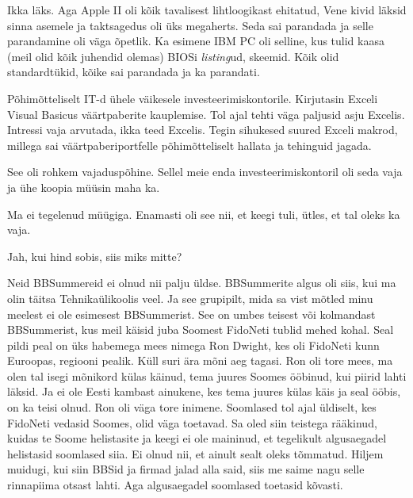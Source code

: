 
Ikka läks. Aga Apple II oli kõik tavalisest 
lihtloogikast ehitatud, Vene kivid läksid sinna asemele ja taktsagedus oli üks 
megaherts. Seda sai parandada ja selle parandamine oli väga õpetlik. Ka 
esimene IBM PC oli selline, kus tulid kaasa (meil olid 
kõik juhendid olemas)  BIOSi \emph{listing}ud, skeemid. Kõik olid 
standardtükid, kõike sai parandada ja ka parandati. 


Põhimõtteliselt IT-d ühele väikesele investeerimiskontorile. Kirjutasin 
Exceli Visual Basicus väärtpaberite 
kauplemise. Tol ajal tehti väga paljusid asju Excelis. Intressi vaja arvutada, 
ikka teed Excelis. Tegin sihukesed suured Exceli makrod, millega sai 
väärtpaberiportfelle põhimõtteliselt hallata ja tehinguid jagada. 


See oli rohkem vajaduspõhine. Sellel meie enda investeerimiskontoril oli seda 
vaja ja ühe koopia müüsin maha ka. 


Ma ei  tegelenud müügiga. Enamasti oli see nii, et keegi tuli, ütles, et tal 
oleks ka vaja. 


Jah, kui hind sobis, siis miks mitte?


Neid BBSummereid ei olnud nii palju üldse. BBSummerite algus  oli siis, kui ma 
olin täitsa Tehnikaülikoolis veel. Ja see grupipilt, mida sa vist 
mõtled minu  
meelest ei ole esimesest BBSummerist. See on umbes teisest või kolmandast 
BBSummerist, kus meil käisid juba Soomest FidoNeti tublid mehed kohal. Seal 
pildi peal on üks habemega mees nimega Ron Dwight, kes 
oli FidoNeti kunn Euroopas, regiooni pealik. Küll suri ära mõni aeg tagasi. Ron 
oli tore mees, ma olen tal isegi mõnikord külas käinud, tema juures Soomes 
ööbinud, kui piirid lahti läksid. Ja ei ole Eesti kambast ainukene, kes tema 
juures külas käis ja seal ööbis, on ka teisi olnud. Ron oli väga tore inimene. 
Soomlased tol ajal üldiselt, kes FidoNeti vedasid Soomes, olid väga toetavad. 
Sa oled siin teistega rääkinud, kuidas te Soome helistasite ja keegi ei ole 
maininud, et tegelikult algusaegadel helistasid soomlased siia. Ei olnud nii, 
et ainult sealt oleks tõmmatud. Hiljem muidugi, kui siin BBSid ja firmad jalad 
alla said, siis me saime nagu selle rinnapiima otsast lahti. Aga algusaegadel 
soomlased toetasid kõvasti. 

